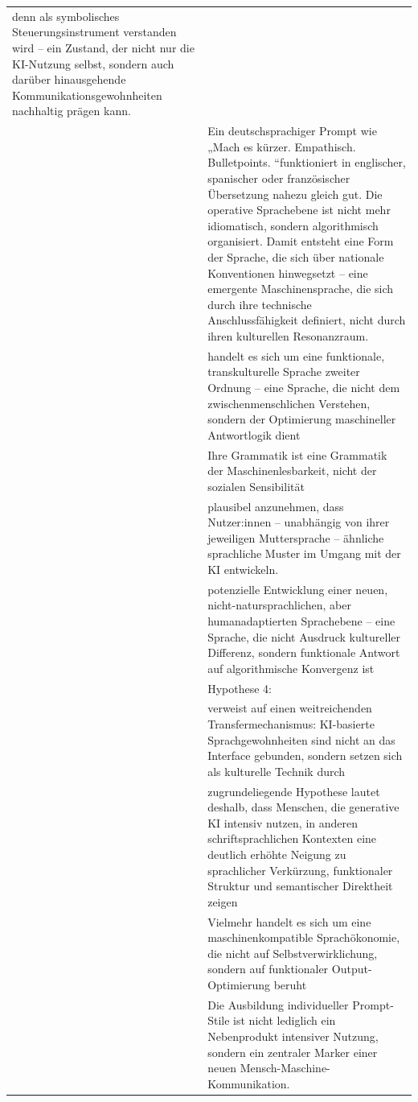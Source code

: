 \documentclass[
  letterpaper,
  DIV=11,
  numbers=noendperiod]{scrartcl}
\begin{document}
\begin{longtable}[]{@{}
  >{\raggedleft\arraybackslash}p{}
  >{\raggedright\arraybackslash}p{}@{}}
denn als symbolisches Steuerungsinstrument verstanden wird -- ein
Zustand, der nicht nur die KI-Nutzung selbst, sondern auch darüber
hinausgehende Kommunikationsgewohnheiten nachhaltig prägen kann. \\
55 & Ein deutschsprachiger Prompt wie „Mach es kürzer. Empathisch.
Bulletpoints. ``funktioniert in englischer, spanischer oder
französischer Übersetzung nahezu gleich gut. Die operative Sprachebene
ist nicht mehr idiomatisch, sondern algorithmisch organisiert. Damit
entsteht eine Form der Sprache, die sich über nationale Konventionen
hinwegsetzt -- eine emergente Maschinensprache, die sich durch ihre
technische Anschlussfähigkeit definiert, nicht durch ihren kulturellen
Resonanzraum. \\
56 & handelt es sich um eine funktionale, transkulturelle Sprache
zweiter Ordnung -- eine Sprache, die nicht dem zwischenmenschlichen
Verstehen, sondern der Optimierung maschineller Antwortlogik dient \\
57 & Ihre Grammatik ist eine Grammatik der Maschinenlesbarkeit, nicht
der sozialen Sensibilität \\
58 & plausibel anzunehmen, dass Nutzer:innen -- unabhängig von ihrer
jeweiligen Muttersprache -- ähnliche sprachliche Muster im Umgang mit
der KI entwickeln. \\
59 & potenzielle Entwicklung einer neuen, nicht-natursprachlichen, aber
humanadaptierten Sprachebene -- eine Sprache, die nicht Ausdruck
kultureller Differenz, sondern funktionale Antwort auf algorithmische
Konvergenz ist \\
60 & Hypothese 4: \\
61 & verweist auf einen weitreichenden Transfermechanismus: KI-basierte
Sprachgewohnheiten sind nicht an das Interface gebunden, sondern setzen
sich als kulturelle Technik durch \\
62 & zugrundeliegende Hypothese lautet deshalb, dass Menschen, die
generative KI intensiv nutzen, in anderen schriftsprachlichen Kontexten
eine deutlich erhöhte Neigung zu sprachlicher Verkürzung, funktionaler
Struktur und semantischer Direktheit zeigen \\
63 & Vielmehr handelt es sich um eine maschinenkompatible
Sprachökonomie, die nicht auf Selbstverwirklichung, sondern auf
funktionaler Output-Optimierung beruht \\
64 & Die Ausbildung individueller Prompt-Stile ist nicht lediglich ein
Nebenprodukt intensiver Nutzung, sondern ein zentraler Marker einer
neuen Mensch-Maschine-Kommunikation. \\

\end{longtable}
\end{document}
